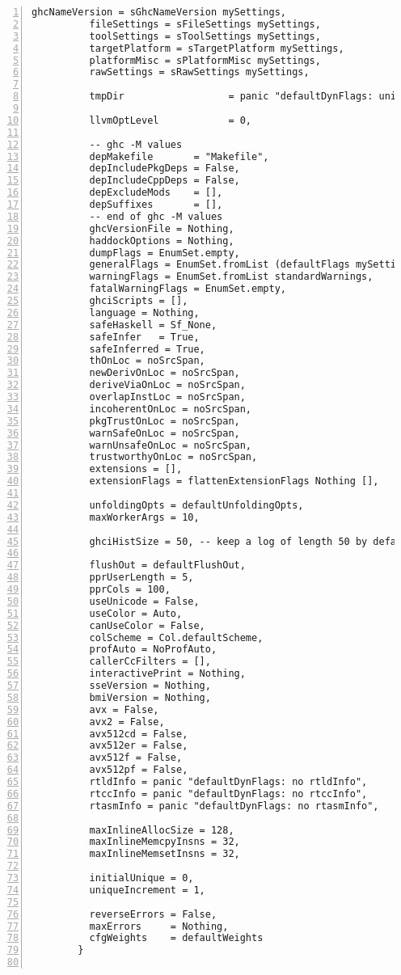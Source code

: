 \documentclass[en]{pracamgr}
\begin{document}
\begin{lstlisting}[numbers=left,stepnumber=1]
          ghcNameVersion = sGhcNameVersion mySettings,
          fileSettings = sFileSettings mySettings,
          toolSettings = sToolSettings mySettings,
          targetPlatform = sTargetPlatform mySettings,
          platformMisc = sPlatformMisc mySettings,
          rawSettings = sRawSettings mySettings,
  
          tmpDir                  = panic "defaultDynFlags: uninitialized tmpDir",
  
          llvmOptLevel            = 0,
  
          -- ghc -M values
          depMakefile       = "Makefile",
          depIncludePkgDeps = False,
          depIncludeCppDeps = False,
          depExcludeMods    = [],
          depSuffixes       = [],
          -- end of ghc -M values
          ghcVersionFile = Nothing,
          haddockOptions = Nothing,
          dumpFlags = EnumSet.empty,
          generalFlags = EnumSet.fromList (defaultFlags mySettings),
          warningFlags = EnumSet.fromList standardWarnings,
          fatalWarningFlags = EnumSet.empty,
          ghciScripts = [],
          language = Nothing,
          safeHaskell = Sf_None,
          safeInfer   = True,
          safeInferred = True,
          thOnLoc = noSrcSpan,
          newDerivOnLoc = noSrcSpan,
          deriveViaOnLoc = noSrcSpan,
          overlapInstLoc = noSrcSpan,
          incoherentOnLoc = noSrcSpan,
          pkgTrustOnLoc = noSrcSpan,
          warnSafeOnLoc = noSrcSpan,
          warnUnsafeOnLoc = noSrcSpan,
          trustworthyOnLoc = noSrcSpan,
          extensions = [],
          extensionFlags = flattenExtensionFlags Nothing [],
  
          unfoldingOpts = defaultUnfoldingOpts,
          maxWorkerArgs = 10,
  
          ghciHistSize = 50, -- keep a log of length 50 by default
  
          flushOut = defaultFlushOut,
          pprUserLength = 5,
          pprCols = 100,
          useUnicode = False,
          useColor = Auto,
          canUseColor = False,
          colScheme = Col.defaultScheme,
          profAuto = NoProfAuto,
          callerCcFilters = [],
          interactivePrint = Nothing,
          sseVersion = Nothing,
          bmiVersion = Nothing,
          avx = False,
          avx2 = False,
          avx512cd = False,
          avx512er = False,
          avx512f = False,
          avx512pf = False,
          rtldInfo = panic "defaultDynFlags: no rtldInfo",
          rtccInfo = panic "defaultDynFlags: no rtccInfo",
          rtasmInfo = panic "defaultDynFlags: no rtasmInfo",
  
          maxInlineAllocSize = 128,
          maxInlineMemcpyInsns = 32,
          maxInlineMemsetInsns = 32,
  
          initialUnique = 0,
          uniqueIncrement = 1,
  
          reverseErrors = False,
          maxErrors     = Nothing,
          cfgWeights    = defaultWeights
        }
  
\end{lstlisting}


 
\end{document}
